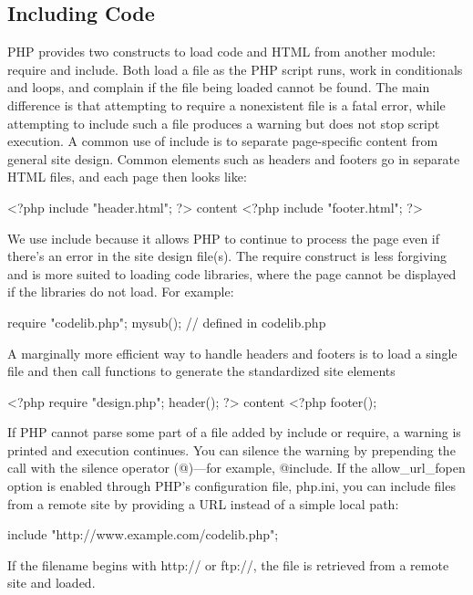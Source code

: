 \documentclass{report}
\begin{document}
\subsection{Including Code}
\bigbreak \noindent 
PHP provides two constructs to load code and HTML from another module: require and include. Both load a file as the PHP script runs, work in conditionals and loops, and complain if the file being loaded cannot be found. The main difference is that attempting to require a nonexistent file is a fatal error, while attempting to include such a file produces a warning but does not stop script execution.
\bigbreak \noindent 
A common use of include is to separate page-specific content from general site design. Common elements such as headers and footers go in separate HTML files, and each page then looks like:
\bigbreak \noindent 
\begin{phpcode}
<?php include "header.html"; ?>
content
<?php include "footer.html"; ?>
\end{phpcode}
\bigbreak \noindent 
We use include because it allows PHP to continue to process the page even if there’s
an error in the site design file(s). The require construct is less forgiving and is more
suited to loading code libraries, where the page cannot be displayed if the libraries do
not load. For example:
\bigbreak \noindent 
\begin{phpcode}
require "codelib.php";
mysub(); // defined in codelib.php
\end{phpcode}
\bigbreak \noindent 
A marginally more efficient way to handle headers and footers is to load a single file and then call functions to generate the standardized site elements
\bigbreak \noindent 
\begin{phpcode}
<?php require "design.php";
header(); ?>
content
<?php footer();
\end{phpcode}
\bigbreak \noindent 
If PHP cannot parse some part of a file added by include or require, a warning is printed
and execution continues. You can silence the warning by prepending the call with the
silence operator (@)—for example, @include.
\bigbreak \noindent 
If the allow\_url\_fopen option is enabled through PHP’s configuration file, php.ini, you
can include files from a remote site by providing a URL instead of a simple local path:
\bigbreak \noindent 
\begin{phpcode}
include "http://www.example.com/codelib.php";
\end{phpcode}
\bigbreak \noindent 
If the filename begins with http:// or ftp://, the file is retrieved from a remote site and loaded.
\end{document}
